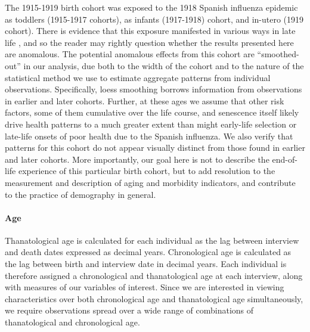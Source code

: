 \documentclass[11pt,oneside]{article} %
\begin{document}
The 1915-1919 birth cohort was exposed to the 1918 Spanish influenza
epidemic as toddlers (1915-1917 cohorts), as infants (1917-1918) cohort, and
in-utero (1919 cohort). There is evidence that this exposure manifested in
various ways in late life \citep[e.g.,][]{almond20061918,myrskyla2013early}, and
so the reader may rightly question whether the results presented here are anomalous.
The potential anomalous effects from this cohort are
``smoothed-out'' in our analysis, due both to the width of the cohort and to the
nature of the statistical method we use to estimate aggregate patterns from
individual observations. Specifically, loess smoothing borrows information
from observations in earlier and later cohorts. Further, at these ages we assume that other risk factors,
some of them cumulative over the life course, and senescence itself likely drive
health patterns to a much greater extent than might early-life selection or
late-life onsets of poor health due to the Spanish influenza.
We also verify that patterns for this cohort do not appear visually distinct
from those found in earlier and later cohorts. More importantly, our goal here
is not to describe the end-of-life experience of this particular birth cohort, but to add
resolution to the measurement and description of aging and morbidity
indicators, and contribute to the practice of demography in general. 

\paragraph*{Age}
Thanatological age is calculated for each individual as the lag between
interview and death dates expressed as decimal years. Chronological age is
calculated as the lag between birth and interview date in decimal years. Each
individual is therefore assigned a chronological and thanatological age at each
interview, along with measures of our variables of interest. Since
we are interested in viewing characteristics over both chronological age and
thanatological age simultaneously, we require observations spread over a wide
range of combinations of thanatological and chronological age.
\end{document}
